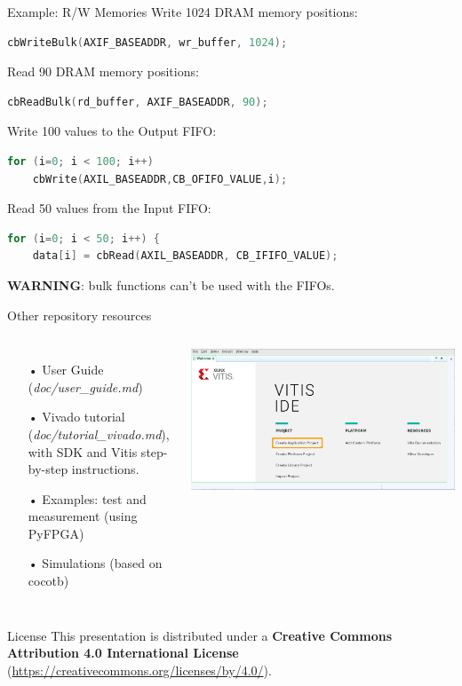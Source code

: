 \documentclass[aspectratio=169]{beamer}
\begin{document}
\begin{frame}[fragile]{Example: R/W Memories}
Write 1024 DRAM memory positions:
  \begin{lstlisting}[language=C, numbers=none, basicstyle=\scriptsize]
cbWriteBulk(AXIF_BASEADDR, wr_buffer, 1024);
  \end{lstlisting}
Read 90 DRAM memory positions:
  \begin{lstlisting}[language=C, numbers=none, basicstyle=\scriptsize]
cbReadBulk(rd_buffer, AXIF_BASEADDR, 90);
  \end{lstlisting}
Write 100 values to the Output FIFO:
  \begin{lstlisting}[language=C, numbers=none, basicstyle=\scriptsize]
for (i=0; i < 100; i++)
    cbWrite(AXIL_BASEADDR,CB_OFIFO_VALUE,i);
  \end{lstlisting}
Read 50 values from the Input FIFO:
  \begin{lstlisting}[language=C, numbers=none, basicstyle=\scriptsize]
for (i=0; i < 50; i++) {
    data[i] = cbRead(AXIL_BASEADDR, CB_IFIFO_VALUE);
  \end{lstlisting}
  \textbf{WARNING}: bulk functions can't be used with the FIFOs.
\end{frame}


\begin{frame}{Other repository resources}
  \begin{columns}
      \begin{itemize}
        \item[•] User Guide (\textit{doc/user\_guide.md})
        \item[•] Vivado tutorial (\textit{doc/tutorial\_vivado.md}), with SDK and Vitis step-by-step instructions.
        \item[•] Examples: test and measurement (using PyFPGA)
        \item[•] Simulations (based on cocotb)
      \end{itemize}
      \center
      \includegraphics[width=1.0\textwidth]{../vivado/tuto/20-3.png}
  \end{columns}
\end{frame}


\begin{frame}{License}
  This presentation is distributed under a
  \textbf{Creative Commons Attribution 4.0 International License}
  (\url{https://creativecommons.org/licenses/by/4.0/}).
\end{frame}
\end{document}
